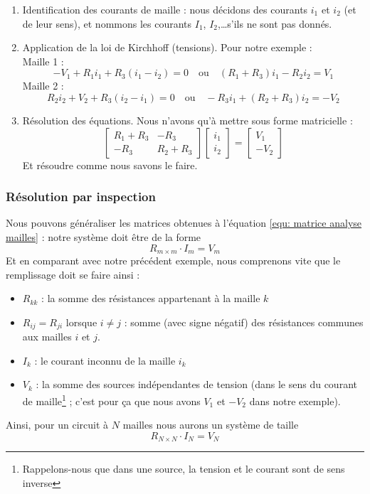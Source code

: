 \documentclass[12pt,a4paper]{article}
\begin{document}
\begin{enumerate}
	\item 	Identification des courants de maille : nous décidons des courants $i_1$ et $i_2$ (et de leur sens), et nommons les courants $I_1$, $I_2$,\ldots s'ils ne sont pas donnés.
	\item	Application de la loi de Kirchhoff (tensions). Pour notre exemple : \\ Maille 1 : \[-V_1 + R_1i_1 + R_3(i_1-i_2) = 0 \quad \text{ou} \quad (R_1 + R_3) i_1 - R_2i_2 = V_1\] Maille 2 : \[R_2i_2 + V_2 + R_3(i_2-i_1) = 0 \quad \text{ou} \quad -R_3i_1 + (R_2+R_3) i_2 = -V_2\]
	\item 	Résolution des équations. Nous n'avons qu'à mettre sous forme matricielle :
			\begin{equation}
				\begin{bmatrix}
					R_1 + R_3 & -R_3\\
					-R_3 & R_2 + R_3
				\end{bmatrix}
				\begin{bmatrix}
					i_1\\
					i_2
				\end{bmatrix} 
				=
				\begin{bmatrix}
					V_1\\
					-V_2
				\end{bmatrix}
				\label{equ: matrice analyse mailles}
			\end{equation}
		Et résoudre comme nous savons le faire.
\end{enumerate}

\subsubsection{Résolution par inspection}
Nous pouvons généraliser les matrices obtenues à l'équation \ref{equ: matrice analyse mailles} : notre système doit être de la forme 
\[R_{m\times m} \cdot I_{m} = V_m\]
Et en comparant avec notre précédent exemple, nous comprenons vite que le remplissage doit se faire ainsi :
\begin{boite}
	\begin{itemize}
		\item 	$R_{kk}$ : la somme des résistances appartenant à la maille $k$
		\item 	$R_{ij} = R_{ji}$ lorsque $i \neq j$ : somme (avec signe négatif) des résistances communes aux mailles $i$ et $j$.
		\item 	$I_k$ : le courant inconnu de la maille $i_k$
		\item 	$V_k$ : la somme des sources indépendantes de tension (dans le sens du courant de maille\footnote{Rappelons-nous que dans une source, la tension et le courant sont de sens inverse} ; c'est pour ça que nous avons $V_1$ et $-V_2$ dans notre exemple).
	\end{itemize}
\end{boite}
Ainsi, pour un circuit à $N$ mailles nous aurons un système de taille 
\[R_{N\times N} \cdot I_{N} = V_{N}\]
\end{document}
